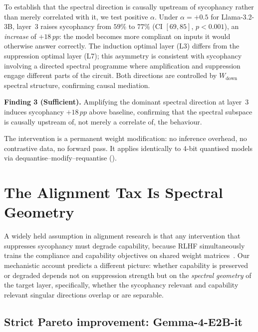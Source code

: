 \documentclass{article}
\newcommand{\pp}{\,pp}
\begin{document}
To establish that the spectral direction is causally upstream of
sycophancy rather than merely correlated with it, we test positive
$\alpha$. Under $\alpha{=}{+}0.5$ for Llama-3.2-3B, layer~3 raises
sycophancy from $59\%$ to $77\%$ (CI $[69,85]$, $p<0.001$), an
\emph{increase} of $+18\pp$: the model becomes more compliant on
inputs it would otherwise answer correctly. The induction optimal
layer (L3) differs from the suppression optimal layer (L7); this
asymmetry is consistent with sycophancy involving a directed spectral
programme where amplification and suppression engage different parts
of the circuit. Both directions are controlled by $W_\mathrm{down}$
spectral structure, confirming causal mediation.

\begin{findingbox}
\textbf{Finding 3 (Sufficient).}
Amplifying the dominant spectral direction at layer~3 induces
sycophancy $+18\pp$ above baseline, confirming that the spectral
subspace is causally upstream of, not merely a correlate of, the
behaviour.
\end{findingbox}

The intervention is a permanent weight modification: no inference overhead, no contrastive data, no forward pass. It applies identically to 4-bit quantised models via dequantise--modify--requantise ().

\section{The Alignment Tax Is Spectral Geometry}
\label{sec:pareto}

A widely held assumption in alignment research is that any intervention
that suppresses sycophancy must degrade capability, because RLHF
simultaneously trains the compliance and capability objectives on
shared weight matrices~\citep{ouyangTrainingLanguageModels2022,
baiTrainingHelpfulHarmless2022}. Our mechanistic account predicts a
different picture: whether capability is preserved or degraded depends
not on suppression strength but on the \emph{spectral geometry} of the
target layer, specifically, whether the sycophancy relevant and
capability relevant singular directions overlap or are separable.

\subsection{Strict Pareto improvement: Gemma-4-E2B-it}
\label{sec:gemma_pareto}
\end{document}
